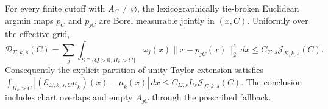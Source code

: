 For every finite cutoff with \(A_C\ne\varnothing\), the lexicographically tie-broken Euclidean argmin maps \(p_C\) and \(p_{jC}\) are Borel measurable jointly in \((x,C)\). Uniformly over the effective grid, \[\mathcal D_{\Sigma,k,s}(C)=\sum_j\int_{S\cap\{Q>0,H_k>C\}}\omega_j(x)\|x-p_{jC}(x)\|_2^s\,dx\le C_{\Sigma,s}\mathcal J_{\Sigma,k,s}(C).\] Consequently the explicit partition-of-unity Taylor extension satisfies \(\int_{H_k>C}|(\mathcal E_{\Sigma,k,s,C}\mu_k)(x)-\mu_k(x)|\,dx\le C_{\Sigma,s}L_s\mathcal J_{\Sigma,k,s}(C)\). The conclusion includes chart overlaps and empty \(A_{jC}\) through the prescribed fallback.